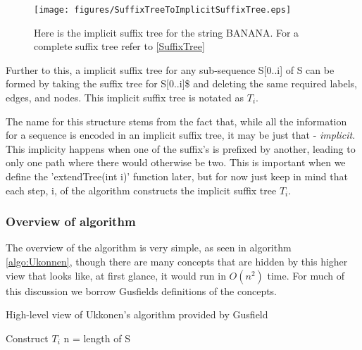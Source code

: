 \documentclass[12pt,twoside,notitlepage]{report}
\begin{document}
				\begin{figure}[h]
			\centerline{\texttt{[image: figures/SuffixTreeToImplicitSuffixTree.eps]}}
			\caption{\label{fig:implicitSuffixTree} Here is the implicit suffix tree for the string BANANA. For a complete suffix tree refer to \ref{SuffixTree}}
\end{figure}

				Further to this, a implicit suffix tree for any sub-sequence S[0..i] of S can be formed by taking the suffix tree for S[0..i]\$ and deleting the same required labels, edges, and nodes. This implicit suffix tree is notated as $T_i$.
				
				The name for this structure stems from the fact that, while all the information for a sequence is encoded in an implicit suffix tree, it may be just that - \emph{implicit}. This implicity happens when one of the suffix's is prefixed by another, leading to only one path where there would otherwise be two. This is important when we define the 'extendTree(int i)' function later, but for now just keep in mind that each step, i, of the algorithm constructs the implicit suffix tree $T_i$.
				
				\subsubsection{Overview of algorithm}
				The overview of the algorithm is very simple, as seen in algorithm \ref{algo:Ukonnen}, though there are many concepts that are hidden by this higher view that looks like, at first glance, it would run in $O(n^2)$ time. For much of this discussion we borrow Gusfields\cite{Gusfeild1999} definitions of the concepts.
				
				\begin{algorithm}
				\caption{High-level view of Ukkonen's algorithm provided by Gusfield\cite{Gusfield1975}}
				\label{algo:Ukonnen}
				\begin{algorithmic}[1]
						\State Construct $T_i$
						\State n = length of S
							\EndFor

						\EndFor


					\EndProcedure
				\end{algorithmic}
				\end{algorithm}
				
\end{document}
